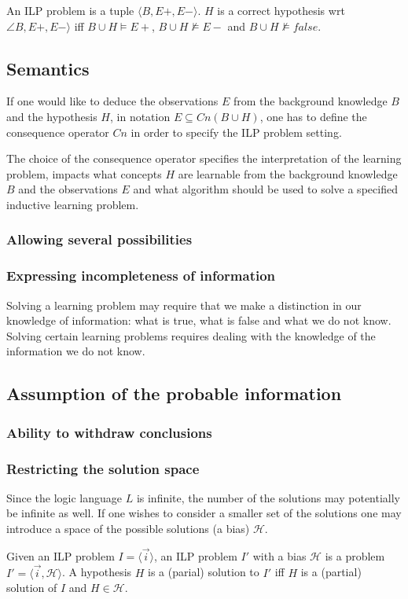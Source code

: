 \begin{defn}
An ILP problem is a tuple $\langle B, E+, E- \rangle$. $H$ is a correct hypothesis wrt $\angle B, E+, E- \rangle$ iff
$B \cup H \models E+$, $B \cup H \not\models E-$ and $B \cup H \not\models false$.
\end{defn}

\subsection{Semantics}\label{problems_in_ilp_semantics}
If one would like to deduce the observations $E$ from the background knowledge $B$ and the hypothesis $H$, in notation $E \subseteq Cn(B \cup H)$, one has to define the consequence operator $Cn$ in order to specify the ILP problem setting.

The choice of the consequence operator specifies the interpretation of the learning problem, impacts what concepts $H$ are learnable from the background knowledge $B$ and the observations $E$ and what algorithm should be used to solve a specified inductive learning problem.

\subsubsection{Allowing several possibilities}


\subsubsection{Expressing incompleteness of information}
Solving a learning problem may require that we make a distinction in our knowledge of information: what is true, what is false and what we do not know.
Solving certain learning problems requires dealing with the knowledge of the information we do not know.

\subsection{Assumption of the probable information}

\subsubsection{Ability to withdraw conclusions}

\subsubsection{Restricting the solution space}
Since the logic language $L$ is infinite, the number of the solutions may potentially be infinite as well. If one wishes to consider a smaller set of the solutions one may introduce a space of the possible solutions (a bias) $\mathcal{H}$.
\begin{defn}
Given an ILP problem $I=\langle \overrightarrow{i} \rangle$,
an ILP problem $I'$ with a bias $\mathcal{H}$ is a problem
$I'=\langle \overrightarrow{i}, \mathcal{H} \rangle$.
A hypothesis $H$ is a (parial) solution to $I'$ iff $H$ is a (partial) solution of $I$ and $H \in \mathcal{H}$.
\end{defn}

